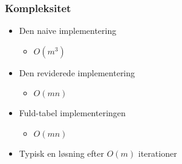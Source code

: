 \begin{frame}
\frametitle{Kompleksitet}
\begin{itemize}
\item Den naive implementering 
	\begin{itemize}
	\item $O(m^3)$ 
	\end{itemize}
\item Den reviderede implementering 
	\begin{itemize}
	\item $O(mn)$
	\end{itemize}
\item Fuld-tabel implementeringen
	\begin{itemize}
	\item $O(mn)$
	\end{itemize} 
\item Typisk en løsning efter $O(m)$ iterationer
\end{itemize}
\end{frame}